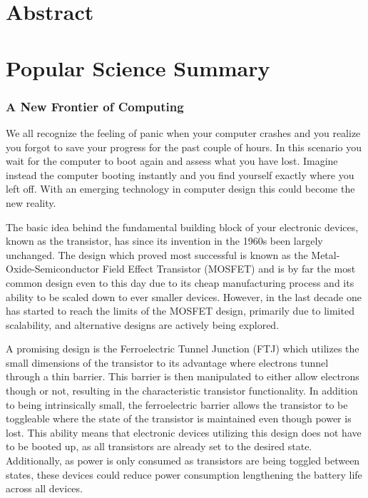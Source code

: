 \documentclass[11pt,twoside]{eitExjobb}
\begin{document}
\MakeTitlePage{}  %
\frontmatter    %
\chapter*{Abstract}

\chapter*{Popular Science Summary}
\subsection*{A New Frontier of Computing}
We all recognize the feeling of panic when your computer crashes and you realize
you forgot to save your progress for the past couple of hours. In this scenario
you wait for the computer to boot again and assess what you have lost. Imagine
instead the computer booting instantly and you find yourself exactly where you
left off. With an emerging technology in computer design this could become the
new reality.

The basic idea behind the fundamental building block of your electronic devices,
known as the transistor, has since its invention in the 1960s been largely
unchanged. The design which proved most successful is known as the
Metal-Oxide-Semiconductor Field Effect Transistor (MOSFET) and is by far the
most common design even to this day due to its cheap manufacturing process and
its ability to be scaled down to ever smaller devices. However, in the last
decade one has started to reach the limits of the MOSFET design, primarily due
to limited scalability, and alternative designs are actively being explored.

A promising design is the Ferroelectric Tunnel Junction (FTJ) which utilizes the
small dimensions of the transistor to its advantage where electrons tunnel
through a thin barrier. This barrier is then manipulated to either allow
electrons though or not, resulting in the characteristic transistor
functionality. In addition to being intrinsically small, the ferroelectric
barrier allows the transistor to be toggleable where the state of the transistor
is maintained even though power is lost. This ability means that electronic
devices utilizing this design does not have to be booted up, as all transistors
are already set to the desired state. Additionally, as power is only consumed as
transistors are being toggled between states, these devices could reduce power
consumption lengthening the battery life across all devices.
\end{document}
